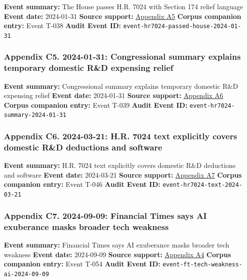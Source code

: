 \documentclass[
  american,
  11pt,
  letterpaper,
]{article}
\begin{document}
\textbf{Event summary:} The House passes H.R. 7024 with Section 174
relief language \textbf{Event date:} 2024-01-31 \textbf{Source support:}
\hyperref[appendix-a5-h-r-7024-tax-relief-for-american-families-and-workers-act-of-2024]{Appendix
A5} \textbf{Corpus companion entry:} Event T-038 \textbf{Audit Event
ID:} \texttt{event-hr7024-passed-house-2024-01-31}

\subsubsection{Appendix C5. 2024-01-31: Congressional summary explains
temporary domestic R\&D expensing
relief}\label{appendix-c5-2024-01-31-congressional-summary-explains-temporary-domestic-r-d-expensing-relief}

\textbf{Event summary:} Congressional summary explains temporary
domestic R\&D expensing relief \textbf{Event date:} 2024-01-31
\textbf{Source support:}
\hyperref[appendix-a6-h-r-7024-tax-relief-for-american-families-and-workers-act-of-2024-crs-summary]{Appendix
A6} \textbf{Corpus companion entry:} Event T-039 \textbf{Audit Event
ID:} \texttt{event-hr7024-summary-2024-01-31}

\subsubsection{Appendix C6. 2024-03-21: H.R. 7024 text explicitly covers
domestic R\&D deductions and
software}\label{appendix-c6-2024-03-21-h-r-7024-text-explicitly-covers-domestic-r-d-deductions-and-software}

\textbf{Event summary:} H.R. 7024 text explicitly covers domestic R\&D
deductions and software \textbf{Event date:} 2024-03-21 \textbf{Source
support:}
\hyperref[appendix-a7-h-r-7024-text-deduction-for-domestic-research-and-experimental-expenditures]{Appendix
A7} \textbf{Corpus companion entry:} Event T-046 \textbf{Audit Event
ID:} \texttt{event-hr7024-text-2024-03-21}

\subsubsection{Appendix C7. 2024-09-09: Financial Times says AI
exuberance masks broader tech
weakness}\label{appendix-c7-2024-09-09-financial-times-says-ai-exuberance-masks-broader-tech-weakness}

\textbf{Event summary:} Financial Times says AI exuberance masks broader
tech weakness \textbf{Event date:} 2024-09-09 \textbf{Source support:}
\hyperref[appendix-a4-ai-exuberance-masks-broad-weakness-in-tech-sector-say-investors]{Appendix
A4} \textbf{Corpus companion entry:} Event T-054 \textbf{Audit Event
ID:} \texttt{event-ft-tech-weakness-ai-2024-09-09}
\end{document}
